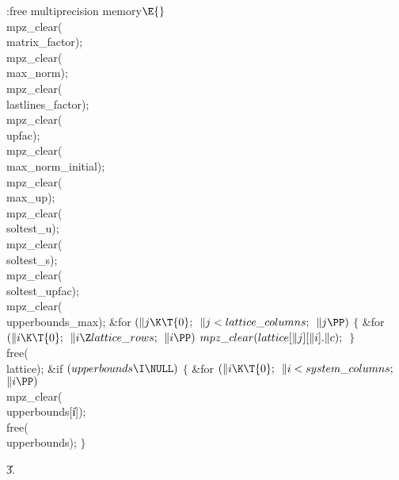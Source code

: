 \B{}:free multiprecision memory\X${}\E{}$\6
\\{mpz\_clear}(\\{matrix\_factor});\6
\\{mpz\_clear}(\\{max\_norm});\6
\\{mpz\_clear}(\\{lastlines\_factor});\6
\\{mpz\_clear}(\\{upfac});\6
\\{mpz\_clear}(\\{max\_norm\_initial});\6
\\{mpz\_clear}(\\{max\_up});\6
\\{mpz\_clear}(\\{soltest\_u});\6
\\{mpz\_clear}(\\{soltest\_s});\6
\\{mpz\_clear}(\\{soltest\_upfac});\6
\\{mpz\_clear}(\\{upperbounds\_max});\6
\&{for} ${}(\|j\K\T{0};{}$ ${}\|j<\\{lattice\_columns};{}$ ${}\|j\PP){}$\5
${}\{{}$\1\6
\&{for} ${}(\|i\K\T{0};{}$ ${}\|i\Z\\{lattice\_rows};{}$ ${}\|i\PP){}$\1\5
${}\\{mpz\_clear}(\\{lattice}[\|j][\|i].\|c);{}$\2\6
\4${}\}{}$\2\6
\\{free}(\\{lattice});\6
\&{if} ${}(\\{upperbounds}\I\NULL){}$\5
${}\{{}$\1\6
\&{for} ${}(\|i\K\T{0};{}$ ${}\|i<\\{system\_columns};{}$ ${}\|i\PP){}$\1\5
\\{mpz\_clear}(\\{upperbounds}[\|i]);\2\6
\\{free}(\\{upperbounds});\6
\4${}\}{}$\2\par
\U3.\fi

